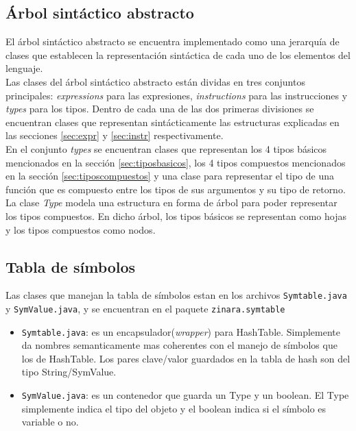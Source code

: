 \documentclass[12pt, spanish]{report}
\begin{document}
\subsection{\'Arbol sint\'actico abstracto}
\label{sec:ast}

El \'arbol sint\'actico abstracto se encuentra implementado como una
jerarqu\'ia de clases que establecen la representaci\'on sint\'actica de
cada uno de los elementos del lenguaje.\\

Las clases del \'arbol sint\'actico abstracto est\'an dividas en tres
conjuntos principales: \emph{expressions} para las expresiones,
\emph{instructions} para las instrucciones y \emph{types} para los
tipos. Dentro de cada una de las dos primeras divisiones se encuentran
clases que representan sint\'acticamente las estructuras explicadas en
las secciones \ref{sec:expr} y \ref{sec:instr} respectivamente.\\

En el conjunto \emph{types} se encuentran clases que representan los 4
tipos b\'asicos mencionados en la secci\'on \ref{sec:tiposbasicos}, los 4
tipos compuestos mencionados en la secci\'on \ref{sec:tiposcompuestos} y una
clase para representar el tipo de una funci\'on que es compuesto entre
los tipos de sus argumentos y su tipo de retorno.\\

La clase \emph{Type} modela una estructura en forma de \'arbol para
poder representar los tipos compuestos. En dicho \'arbol, los tipos
b\'asicos se representan como hojas y los tipos compuestos como nodos.

\subsection{Tabla de s\'imbolos}
\label{sec:st}

Las clases que manejan la tabla de s\'imbolos estan en los archivos
\texttt{Symtable.java} y \texttt{SymValue.java}, y se encuentran en el paquete
\texttt{zinara.symtable}

\begin{itemize}
\item \texttt{Symtable.java}: es un encapsulador(\emph{wrapper}) para
  HashTable. Simplemente da nombres semanticamente mas coherentes con
  el manejo de s\'imbolos que los de HashTable. Los pares clave/valor
  guardados en la tabla de hash son del tipo String/SymValue.

\item \texttt{SymValue.java}: es un contenedor que guarda un Type y un
  boolean. El Type simplemente indica el tipo del objeto y el boolean
  indica si el s\'imbolo es variable o no.
\end{itemize}
\end{document}

